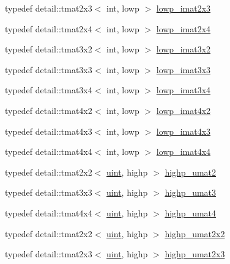 \begin{CompactItemize}
\item 
typedef detail::tmat2x3$<$ int, lowp $>$ \hyperlink{group__gtc__matrix__integer_g5757953c508a6e05bf3573d6c099cf88}{lowp\_\-imat2x3}
\item 
typedef detail::tmat2x4$<$ int, lowp $>$ \hyperlink{group__gtc__matrix__integer_g4d859ef48cdfb15b2c9acc98064dd272}{lowp\_\-imat2x4}
\item 
typedef detail::tmat3x2$<$ int, lowp $>$ \hyperlink{group__gtc__matrix__integer_g250780f2be05f698b881b04ba7ce0452}{lowp\_\-imat3x2}
\item 
typedef detail::tmat3x3$<$ int, lowp $>$ \hyperlink{group__gtc__matrix__integer_ge0d6068aaf9b1f8f06c6cc32941f9471}{lowp\_\-imat3x3}
\item 
typedef detail::tmat3x4$<$ int, lowp $>$ \hyperlink{group__gtc__matrix__integer_gba7c2c9f782278aaa10dad882d73ef0d}{lowp\_\-imat3x4}
\item 
typedef detail::tmat4x2$<$ int, lowp $>$ \hyperlink{group__gtc__matrix__integer_g0d7055814ab969df3b844ba9c52dbf61}{lowp\_\-imat4x2}
\item 
typedef detail::tmat4x3$<$ int, lowp $>$ \hyperlink{group__gtc__matrix__integer_g73858cf965b0aa7e72908eb817c192d6}{lowp\_\-imat4x3}
\item 
typedef detail::tmat4x4$<$ int, lowp $>$ \hyperlink{group__gtc__matrix__integer_g92339a0b053a721e3b88267e6d175014}{lowp\_\-imat4x4}
\item 
typedef detail::tmat2x2$<$ \hyperlink{group__core__precision_g4fd29415871152bfb5abd588334147c8}{uint}, highp $>$ \hyperlink{group__gtc__matrix__integer_g0c89800e3f63f82da4a4159004811cec}{highp\_\-umat2}
\item 
typedef detail::tmat3x3$<$ \hyperlink{group__core__precision_g4fd29415871152bfb5abd588334147c8}{uint}, highp $>$ \hyperlink{group__gtc__matrix__integer_g2a271939d0123103f088e325e5123385}{highp\_\-umat3}
\item 
typedef detail::tmat4x4$<$ \hyperlink{group__core__precision_g4fd29415871152bfb5abd588334147c8}{uint}, highp $>$ \hyperlink{group__gtc__matrix__integer_gf12f0d2744e809e64469d27ef392aa98}{highp\_\-umat4}
\item 
typedef detail::tmat2x2$<$ \hyperlink{group__core__precision_g4fd29415871152bfb5abd588334147c8}{uint}, highp $>$ \hyperlink{group__gtc__matrix__integer_g428410468e33d16dc8aee08b17166669}{highp\_\-umat2x2}
\item 
typedef detail::tmat2x3$<$ \hyperlink{group__core__precision_g4fd29415871152bfb5abd588334147c8}{uint}, highp $>$ \hyperlink{group__gtc__matrix__integer_g309076d055b5511a7071ebb5f660ed83}{highp\_\-umat2x3}

\end{CompactItemize}
